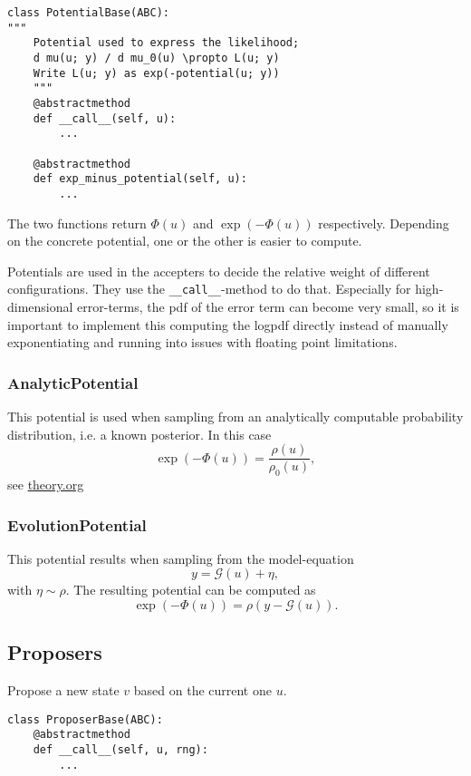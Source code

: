 \documentclass[11pt]{article}
\newcommand{\G}[1]{{\mathcal{G} \left( #1 \right)}}
\begin{document}
\begin{verbatim}
class PotentialBase(ABC):
"""
    Potential used to express the likelihood;
    d mu(u; y) / d mu_0(u) \propto L(u; y)
    Write L(u; y) as exp(-potential(u; y))
    """
    @abstractmethod
    def __call__(self, u):
        ...

    @abstractmethod
    def exp_minus_potential(self, u):
        ...
\end{verbatim}

The two functions return \(\Phi(u)\) and \(\exp(-\Phi(u))\) respectively. Depending on the
concrete potential, one or the other is easier to compute.

Potentials are used in the accepters to decide the relative weight of different configurations.
They use the \texttt{\_\_call\_\_}-method to do that. Especially for high-dimensional error-terms, the
pdf of the error term can become very small, so it is important to implement this computing the
logpdf directly instead of manually exponentiating and running into issues with floating point
limitations.

\subsubsection{AnalyticPotential}
\label{sec:org2cb6f06}

This potential is used when sampling from an analytically computable probability distribution,
i.e. a known posterior. In this case
$$\exp(-\Phi(u)) = \frac{\rho(u)}{\rho_0(u)},$$
see \url{theory.org}
\subsubsection{EvolutionPotential}
\label{sec:org420cad1}

This potential results when sampling from the model-equation
$$y = \G{u} + \eta,$$
with \(\eta \sim \rho\). The resulting potential can be computed as
$$\exp(-\Phi(u)) = \rho(y - \G{u}).$$

\subsection{Proposers}
\label{sec:orgd7c45f2}

Propose a new state \(v\) based on the current one \(u\).

\begin{verbatim}
class ProposerBase(ABC):
    @abstractmethod
    def __call__(self, u, rng):
        ...
\end{verbatim}
\end{document}
